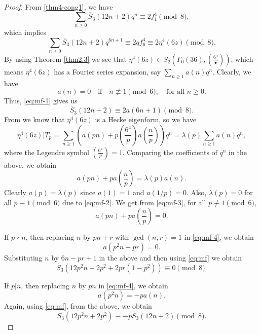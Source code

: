 \documentclass[12pt]{amsart}
\newcommand{\sst}{\overline{S}}
\theoremstyle{plain}
\theoremstyle{definition}
\begin{document}
\begin{proof}
    From \eqref{thm4-cong1}, we have
    \[
    \sum_{n\geq 0}\sst_3(12n+2)q^n\equiv 2f_1^4 \pmod 8,
    \]
    which implies
    \begin{equation}\label{eq:mf-1}
        \sum_{n\geq 0}\sst_3(12n+2)q^{6n+1}\equiv 2qf_{6}^4\equiv 2\eta^4(6z)\pmod 8.
    \end{equation}
    By using Theorem \ref{thm2.3} we see that $\eta^4(6z)\in S_2\left(\Gamma_0(36),\left(\frac{6^4}{\bullet}\right)\right)$, which means $\eta^4(6z)$ has a Fourier series expansion, say $\sum_{n\geq 1}a(n)q^n$. Clearly, we have
    \begin{equation}\label{eq:mf-2}
    a(n)=0 \quad \text{if} \quad n\not\equiv 1\pmod{6}, \quad \text{for all $n\geq 0$}. 
    \end{equation}
    Thus, \eqref{eq:mf-1} gives us
    \begin{equation}\label{eq:mf}
        \sst_3(12n+2)\equiv 2a(6n+1) \pmod 8.
    \end{equation}
    From \cite[pp. 4853]{Mar96} we know that $\eta^4(6z)$ is a Hecke eigenform, so we have
    \[
    \eta^4(6z)|T_p=\sum_{n\geq 1}\left(a(pn)+p\left(\frac{6^4}{p}\right)a\left(\frac{n}{p}\right)\right)
    q^n=\lambda(p)\sum_{n\geq 1}a(n)q^n,
    \]
    where the Legendre symbol $\left(\frac{6^4}{p}\right)=1$. Comparing the coefficients of $q^n$ in the above, we obtain
    \begin{equation}\label{eq:mf-3}
        a(pn)+pa\left(\frac{n}{p}\right)=\lambda(p)a(n).
    \end{equation}
    Clearly $a(p)=\lambda(p)$ since $a(1)=1$ and $a(1/p)=0$. Also, $\lambda(p)=0$ for all $p\equiv 1\pmod 6$ due to \eqref{eq:mf-2}. We get from \eqref{eq:mf-3}, for all $p\not \equiv 1 \pmod 6$,
    \begin{equation}\label{eq:mf-4}
        a(pn)+pa\left(\frac{n}{p}\right)=0.
    \end{equation}

If $p\nmid n$, then replacing $n$ by $pn+r$ with $\gcd(n,r)=1$ in \eqref{eq:mf-4}, we obtain
\begin{equation}
    a(p^2n+pr)=0.
\end{equation}
Substituting $n$ by $6n-pr+1$ in the above and then using \eqref{eq:mf} we obtain
\begin{equation}\label{eq:mf-19}
    \sst_3(12p^2n+2p^2+2pr(1-p^2))\equiv 0 \pmod 8.
\end{equation}

If $p|n$, then replacing $n$ by $pn$ in \eqref{eq:mf-4}, we obtain
\[
a(p^2n)=-pa(n).
\]
Again, using \eqref{eq:mf}, from the above, we obtain
\begin{equation}\label{eq:mf-21}
    \sst_3(12p^2n+2p^2)\equiv -p\sst_3(12n+2) \pmod8.
\end{equation}


\end{proof}
\end{document}
